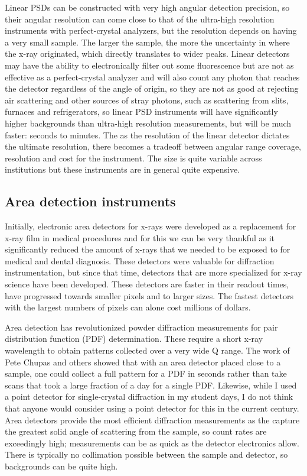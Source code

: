 Linear PSDs can be constructed with very high angular detection precision, so their angular resolution can come close to that of the ultra-high resolution instruments with perfect-crystal analyzers, but the resolution depends on having a very small sample. The larger the sample, the more the uncertainty in where the x-ray originated, which directly translates to wider peaks. Linear detectors may have the ability to electronically filter out some fluorescence but are not as effective as a perfect-crystal analyzer and will also count any photon that reaches the detector regardless of the angle of origin, so they are not as good at rejecting air scattering and other sources of stray photons, such as scattering from slits, furnaces and refrigerators, so linear PSD instruments will have significantly higher backgrounds than ultra-high resolution measurements, but will be much faster: seconds to minutes. The as the resolution of the linear detector dictates the ultimate resolution, there becomes a tradeoff between angular range coverage, resolution and cost for the instrument. The size is quite variable across institutions but these instruments are in general quite expensive. 
\subsection{Area detection instruments} Initially, electronic area detectors for x-rays were developed as a replacement for x-ray film in medical procedures and for this we can be very thankful as it significantly reduced the amount of x-rays that we needed to be exposed to for medical and dental diagnosis. These detectors were valuable for diffraction instrumentation, but since that time, detectors that are more specialized for x-ray science have been developed. These detectors are faster in their readout times, have progressed towards smaller pixels and to larger sizes. The fastest detectors with the largest numbers of pixels can alone cost millions of dollars. 

Area detection has revolutionized powder diffraction measurements for pair distribution function (PDF) determination. These require a short x-ray wavelength to obtain patterns collected over a very wide Q range. The work of Pete Chupas and others showed that with an area detector placed close to a sample, one could collect a full pattern for a PDF in seconds rather than take scans that took a large fraction of a day for a single PDF. Likewise, while I used a point detector for single-crystal diffraction in my student days, I do not think that anyone would consider using a point detector for this in the current century. Area detectors provide the most efficient diffraction measurements as the capture the greatest solid angle of scattering from the sample, so count rates are exceedingly high; measurements can be as quick as the detector electronics allow. There is typically no collimation possible between the sample and detector, so backgrounds can be quite high. 

